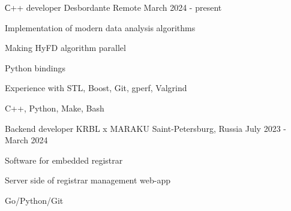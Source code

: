 

\begin{cventries}

  \cventry
    {С++ developer} %
    {Desbordante} %
    {Remote} %
    {March 2024 - present} %
    {
      \begin{cvitems} %
        \item {Implementation of modern data analysis algorithms}
        \item {Making HyFD algorithm parallel}
        \item {Python bindings}
        \item {Experience with STL, Boost, Git, gperf, Valgrind}
        \item {C++, Python, Make, Bash}
      \end{cvitems}
    }

  \cventry
    {Backend developer} %
    {KRBL x MARAKU} %
    {Saint-Petersburg, Russia} %
    {July 2023 - March 2024} %
    {
      \begin{cvitems} %
        \item {Software for embedded registrar}
        \item {Server side of registrar management web-app}
        \item {Go/Python/Git}
      \end{cvitems}
    }

\end{cventries}
